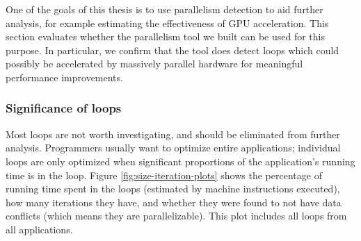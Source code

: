 \documentclass[12pt,twoside]{reedthesis}
\begin{document}
		One of the goals of this thesis is to use parallelism detection to aid further analysis, for example estimating the effectiveness of GPU acceleration. 
		This section evaluates whether the parallelism tool we built can be used for this purpose. In particular, we confirm that the tool does detect loops which could possibly be accelerated by massively parallel hardware for meaningful performance improvements. 
		
		
		\subsubsection{Significance of loops}
		
		Most loops are not worth investigating, and should be eliminated from further analysis. 
		Programmers usually want to optimize entire applications; individual loops are only optimized when significant proportions of the application's running time is in the loop. 
		Figure \ref{fig:size-iteration-plots} shows the percentage of running time spent in the loops (estimated by machine instructions executed), how many iterations they have, and whether they were found to not have data conflicts (which means they are parallelizable). This plot includes all loops from all applications. 
		
\end{document}
